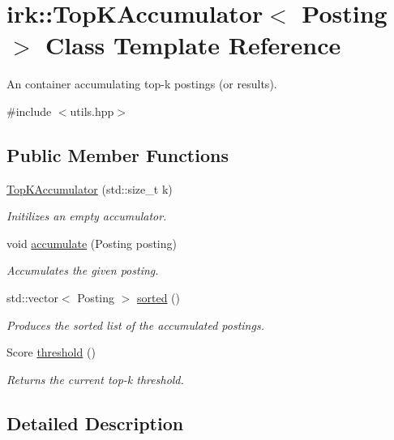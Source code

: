 \hypertarget{classirk_1_1TopKAccumulator}{}\section{irk\+:\+:Top\+K\+Accumulator$<$ Posting $>$ Class Template Reference}
\label{classirk_1_1TopKAccumulator}


An container accumulating top-\/k postings (or results).  




{\ttfamily \#include $<$utils.\+hpp$>$}

\subsection*{Public Member Functions}
\begin{DoxyCompactItemize}
\item 
\mbox{\hyperlink{classirk_1_1TopKAccumulator_a4f610f220ca415333709456f1acf65e2}{Top\+K\+Accumulator}} (std\+::size\+\_\+t k)
\begin{DoxyCompactList}\small\item\em Initilizes an empty accumulator. \end{DoxyCompactList}\item 
void \mbox{\hyperlink{classirk_1_1TopKAccumulator_a2292c74efb19b719f65287cf4d0e1dec}{accumulate}} (Posting posting)
\begin{DoxyCompactList}\small\item\em Accumulates the given posting. \end{DoxyCompactList}\item 
std\+::vector$<$ Posting $>$ \mbox{\hyperlink{classirk_1_1TopKAccumulator_a1bfdc5fdd3d6957ac7dd7eddb7e160fe}{sorted}} ()
\begin{DoxyCompactList}\small\item\em Produces the sorted list of the accumulated postings. \end{DoxyCompactList}\item 
Score \mbox{\hyperlink{classirk_1_1TopKAccumulator_a0b557d7814259c5fcb2cf6528c13f45a}{threshold}} ()
\begin{DoxyCompactList}\small\item\em Returns the current top-\/k threshold. \end{DoxyCompactList}\end{DoxyCompactItemize}


\subsection{Detailed Description}
